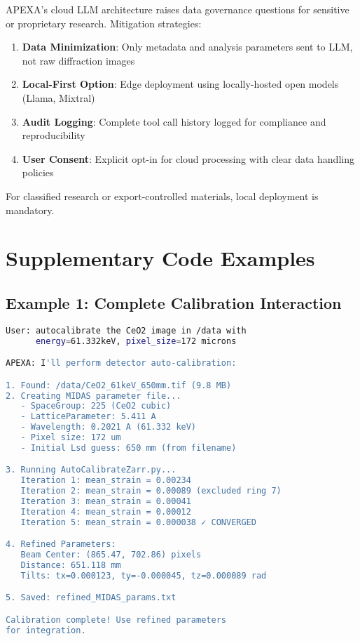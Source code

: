 \documentclass[11pt]{article}
\begin{document}
APEXA's cloud LLM architecture raises data governance questions for sensitive or proprietary research. Mitigation strategies:

\begin{enumerate}
    \item \textbf{Data Minimization}: Only metadata and analysis parameters sent to LLM, not raw diffraction images
    \item \textbf{Local-First Option}: Edge deployment using locally-hosted open models (Llama, Mixtral)
    \item \textbf{Audit Logging}: Complete tool call history logged for compliance and reproducibility
    \item \textbf{User Consent}: Explicit opt-in for cloud processing with clear data handling policies
\end{enumerate}

For classified research or export-controlled materials, local deployment is mandatory.

\section{Supplementary Code Examples}

\subsection{Example 1: Complete Calibration Interaction}

\begin{lstlisting}[language=bash]
User: autocalibrate the CeO2 image in /data with
      energy=61.332keV, pixel_size=172 microns

APEXA: I'll perform detector auto-calibration:

1. Found: /data/CeO2_61keV_650mm.tif (9.8 MB)
2. Creating MIDAS parameter file...
   - SpaceGroup: 225 (CeO2 cubic)
   - LatticeParameter: 5.411 A
   - Wavelength: 0.2021 A (61.332 keV)
   - Pixel size: 172 um
   - Initial Lsd guess: 650 mm (from filename)

3. Running AutoCalibrateZarr.py...
   Iteration 1: mean_strain = 0.00234
   Iteration 2: mean_strain = 0.00089 (excluded ring 7)
   Iteration 3: mean_strain = 0.00041
   Iteration 4: mean_strain = 0.00012
   Iteration 5: mean_strain = 0.000038 ✓ CONVERGED

4. Refined Parameters:
   Beam Center: (865.47, 702.86) pixels
   Distance: 651.118 mm
   Tilts: tx=0.000123, ty=-0.000045, tz=0.000089 rad

5. Saved: refined_MIDAS_params.txt

Calibration complete! Use refined parameters
for integration.
\end{lstlisting}
\end{document}
